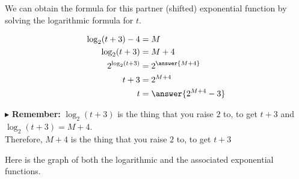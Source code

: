 \documentclass{ximera}
\begin{document}
We can obtain the formula for this partner (shifted) exponential function by solving the logarithmic formula for $t$.



\begin{explanation}

\begin{align*}
\log_2(t+3) - 4 & = M \\
\log_2(t+3) & = M + 4 \\
2^{\log_2(t+3)} & = 2^{\answer{M+4}} \\
t+3 & = 2^{M+4} \\
t & = \answer{2^{M+4} - 3}
\end{align*}

\end{explanation}


$\blacktriangleright$ \textbf{Remember:} $\log_2(t+3)$ is the thing that you raise $2$ to, to get $t+3$ and $\log_2(t+3) = M+4$.  \\

Therefore, $M+4$ is the thing that you raise $2$ to, to get $t+3$





Here is the graph of both the logarithmic and the associated exponential functions.
\end{document}

